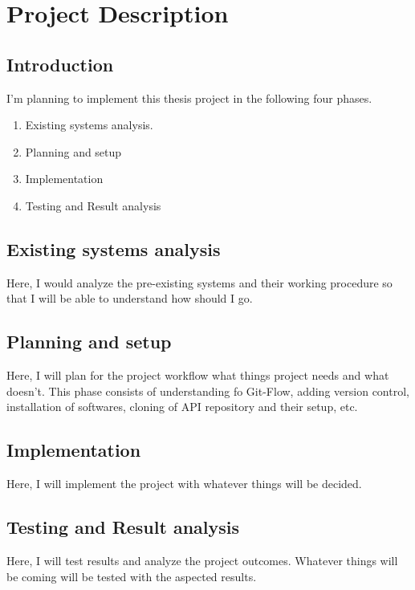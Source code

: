 \chapter{Project Description}

\section{Introduction}

I’m planning to implement this thesis project in the following four phases.

\begin{enumerate}
	\item {Existing systems analysis.}
	\item {Planning and setup}
	\item {Implementation}
	\item {Testing and Result analysis}
\end{enumerate}

\section{Existing systems analysis}

Here, I would analyze the pre-existing systems and their working procedure so that I will be able to understand how should I go.

\section{Planning and setup}

Here, I will plan for the project workflow what
things project needs and what doesn’t. This phase consists of
understanding fo Git-Flow, adding version control, installation of softwares, cloning of API repository and their setup, etc.

\section{Implementation}

Here, I will implement the project with whatever things will be decided.

\section{Testing and Result analysis}

Here, I will test results and analyze the project outcomes. Whatever things will be coming will be tested with the aspected results.
